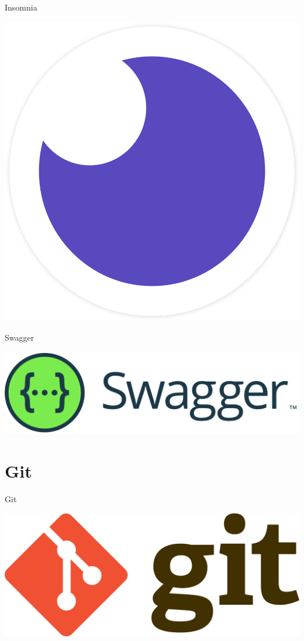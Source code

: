 \documentclass{beamer}
\begin{document}
\begin{frame}{Insomnia}
\begin{center}
  \includegraphics[scale=0.085]{images/insomnia-logo.png}
\end{center}
\end{frame}

\begin{frame}{Swagger}
\begin{center}
  \includegraphics[scale=0.18]{images/swagger.png}
\end{center}
\end{frame}

\section{Git}

\begin{frame}{Git}
\begin{center}
  \includegraphics[scale=0.25]{images/git-logo.png}
\end{center}
\end{frame}
\end{document}
